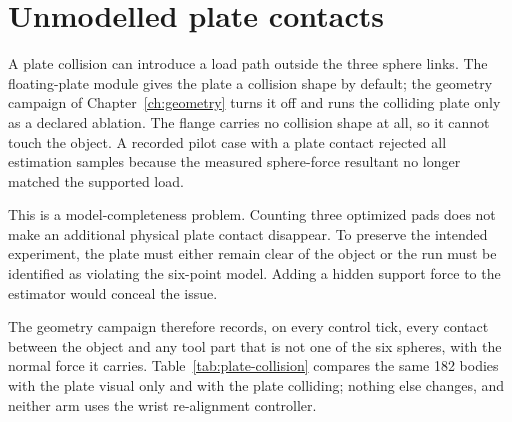 \section{Unmodelled plate contacts}

A plate collision can introduce a load path outside the three sphere links. The floating-plate module gives the plate a collision shape by default; the geometry campaign of Chapter~\ref{ch:geometry} turns it off and runs the colliding plate only as a declared ablation. The flange carries no collision shape at all, so it cannot touch the object. A recorded pilot case with a plate contact rejected all estimation samples because the measured sphere-force resultant no longer matched the supported load.

This is a model-completeness problem. Counting three optimized pads does not make an additional physical plate contact disappear. To preserve the intended experiment, the plate must either remain clear of the object or the run must be identified as violating the six-point model. Adding a hidden support force to the estimator would conceal the issue.

The geometry campaign therefore records, on every control tick, every contact between the object and any tool part that is not one of the six spheres, with the normal force it carries. Table~\ref{tab:plate-collision} compares the same 182 bodies with the plate visual only and with the plate colliding; nothing else changes, and neither arm uses the wrist re-alignment controller.

\begin{table}[htbp]\centering\small
{}
\caption{Load-path audit of the floating plate on the geometry campaign. A colliding plate touches 69 of 80 random polytopes, carries up to 92\% of the squeeze, and breaks the estimate on most of them, while the number of bodies placed hardly changes.}
\label{tab:plate-collision}
\end{table}


